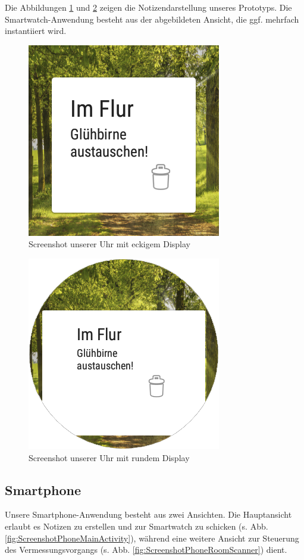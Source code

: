 Die Abbildungen \ref{fig:ScreenshotWatchEckig} und \ref{fig:ScreenshotWatchRund} zeigen
die Notizendarstellung unseres Prototyps. Die Smartwatch-Anwendung besteht aus der abgebildeten Ansicht, die ggf. mehrfach instantiiert wird.

\begin{figure}[H]
\centering
\includegraphics[width=0.3\linewidth]{../Bilder/ScreenshotWatchEckig}
\caption{Screenshot unserer Uhr mit eckigem Display}
\label{fig:ScreenshotWatchEckig}
\end{figure}

\begin{figure}[H]
\centering
\includegraphics[width=0.3\linewidth]{../Bilder/ScreenshotWatchRund}
\caption{Screenshot unserer Uhr mit rundem Display}
\label{fig:ScreenshotWatchRund}
\end{figure}

\subsection{Smartphone}
Unsere Smartphone-Anwendung besteht aus zwei Ansichten. Die Hauptansicht erlaubt es Notizen zu erstellen und zur Smartwatch zu schicken (s. Abb. \ref{fig:ScreenshotPhoneMainActivity}), während eine weitere Ansicht zur Steuerung des Vermessungsvorgangs (s. Abb. \ref{fig:ScreenshotPhoneRoomScanner}) dient.
 
